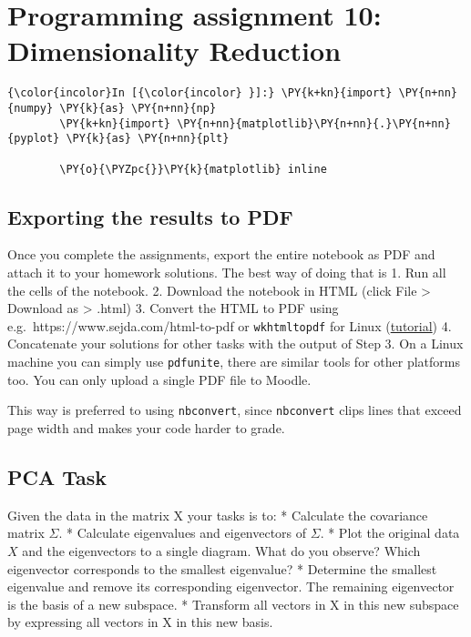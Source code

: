 
    
    \hypertarget{programming-assignment-10-dimensionality-reduction}{%
\section{Programming assignment 10: Dimensionality
Reduction}\label{programming-assignment-10-dimensionality-reduction}}

    \begin{Verbatim}[commandchars=\\\{\}]
{\color{incolor}In [{\color{incolor} }]:} \PY{k+kn}{import} \PY{n+nn}{numpy} \PY{k}{as} \PY{n+nn}{np}
        \PY{k+kn}{import} \PY{n+nn}{matplotlib}\PY{n+nn}{.}\PY{n+nn}{pyplot} \PY{k}{as} \PY{n+nn}{plt}
        
        \PY{o}{\PYZpc{}}\PY{k}{matplotlib} inline
\end{Verbatim}

    \hypertarget{exporting-the-results-to-pdf}{%
\subsection{Exporting the results to
PDF}\label{exporting-the-results-to-pdf}}

Once you complete the assignments, export the entire notebook as PDF and
attach it to your homework solutions. The best way of doing that is 1.
Run all the cells of the notebook. 2. Download the notebook in HTML
(click File \textgreater{} Download as \textgreater{} .html) 3. Convert
the HTML to PDF using e.g.~https://www.sejda.com/html-to-pdf or
\texttt{wkhtmltopdf} for Linux
(\href{https://www.cyberciti.biz/open-source/html-to-pdf-freeware-linux-osx-windows-software/}{tutorial})
4. Concatenate your solutions for other tasks with the output of Step 3.
On a Linux machine you can simply use \texttt{pdfunite}, there are
similar tools for other platforms too. You can only upload a single PDF
file to Moodle.

This way is preferred to using \texttt{nbconvert}, since
\texttt{nbconvert} clips lines that exceed page width and makes your
code harder to grade.

    \hypertarget{pca-task}{%
\subsection{PCA Task}\label{pca-task}}

    Given the data in the matrix X your tasks is to: * Calculate the
covariance matrix \(\Sigma\). * Calculate eigenvalues and eigenvectors
of \(\Sigma\). * Plot the original data \(X\) and the eigenvectors to a
single diagram. What do you observe? Which eigenvector corresponds to
the smallest eigenvalue? * Determine the smallest eigenvalue and remove
its corresponding eigenvector. The remaining eigenvector is the basis of
a new subspace. * Transform all vectors in X in this new subspace by
expressing all vectors in X in this new basis.

